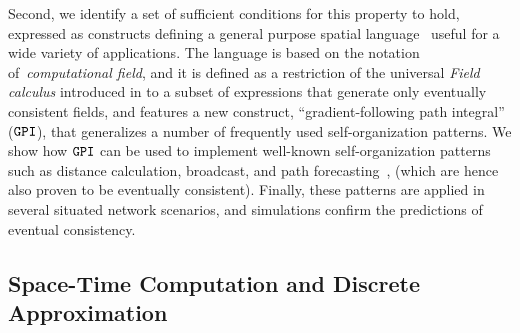 \documentclass[12pt,a4paper,twoside,openright]{book}
\begin{document}
Second, we identify a set of sufficient conditions for this property to hold, expressed as constructs defining a general purpose spatial language~\cite{SpatialIGI2013} useful for a wide variety of applications.
%
The language is based on the notation of~\emph{computational field}, and it is defined as a restriction of the universal \emph{Field calculus} introduced in  to a subset of expressions that generate only eventually consistent fields, and features a new construct, ``gradient-following path integral'' ($\texttt{GPI}$), that generalizes a number of frequently used self-organization patterns.
%
We show how $\texttt{GPI}$ can be used to implement well-known self-organization patterns such as distance calculation, broadcast, and path forecasting~\cite{Montagna-MONET2012,VD-COORD2014-LNCS2014}, (which are hence also proven to be eventually consistent).
%
Finally, these patterns are applied in several situated network scenarios, and simulations confirm the predictions of eventual consistency.

\subsection{Space-Time Computation and Discrete Approximation}
\end{document}
